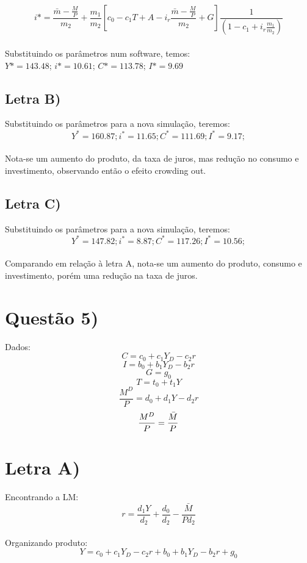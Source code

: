 \documentclass{article}
\begin{document}
\begin{equation}
i* =  \frac{\bar{m}-\frac{M}{P}}{m_2} + \frac{m_1}{m_2} [c_0 - c_1 T + A - i_r \frac{\bar{m}-\frac{M}{P}}{m_2} + G] \frac{1}{(1 - c_1 + i_r \frac{m_1}{m_2})}
\end{equation}
\\
Substituindo os parâmetros num software, temos:\\
$Y*= 143.48$; $i*=10.61$; $C* = 113.78$; $I*=9.69$
\clearpage

\subsection*{Letra B)}
Substituindo os parâmetros para a nova simulação, teremos:
$$Y^*= 160.87; i^*=11.65; C^*=111.69; I^*=9.17;$$
\\
Nota-se um aumento do produto, da taxa de juros, mas redução no consumo e investimento, observando então o efeito crowding out.

\subsection*{Letra C)}
Substituindo os parâmetros para a nova simulação, teremos:
$$Y^*= 147.82; i^*=8.87; C^*=117.26; I^*=10.56;$$
\\
Comparando em relação à letra A, nota-se um aumento do produto, consumo e investimento, porém uma redução na taxa de juros.
\clearpage

\section*{Questão 5)}
Dados:
$$C = c_0 + c_1 Y_D - c_2 r$$
$$I = b_0 + b_1 Y_D - b_2 r$$
$$G = g_0$$
$$T = t_0 + t_1 Y$$
$$\frac{M^D}{P}=d_0 + d_1Y - d_2 r$$
$$\frac{M^D}{P}=\frac{\Bar{M}}{P}$$

\section*{Letra A)}

Encontrando a LM:
\begin{equation}\label{eq:5ai}
r=\frac{d_1Y}{d_2}+\frac{d_0}{d_2}-\frac{\bar{M}}{P d_2}
\end{equation}
\\
Organizando produto:
\begin{equation}
Y = c_0 + c_1 Y_D - c_2 r + b_0 + b_1 Y_D - b_2 r + g_0
\end{equation}
\end{document}
